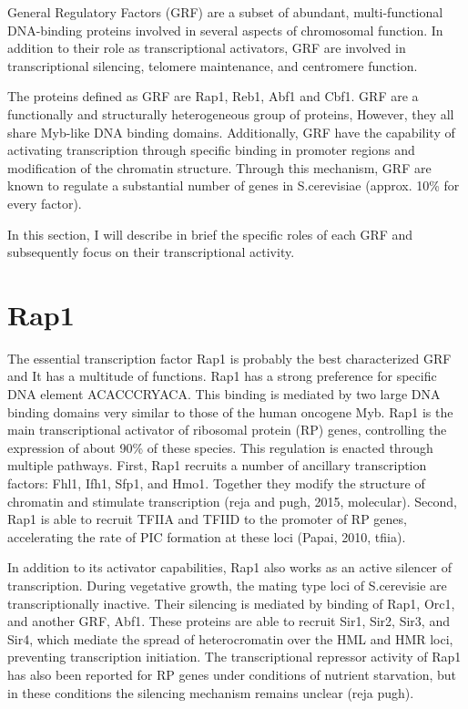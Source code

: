General Regulatory Factors (GRF) are a subset of abundant, multi-functional DNA-binding proteins involved in several aspects of chromosomal function. In addition to their role as transcriptional activators, GRF are involved in transcriptional silencing, telomere maintenance, and centromere function.

The proteins defined as GRF are Rap1, Reb1, Abf1 and Cbf1. GRF are a functionally and structurally heterogeneous group of proteins, However, they all share Myb-like DNA binding domains. Additionally, GRF have the capability of activating transcription through specific binding in promoter regions and modification of the chromatin structure. Through this mechanism, GRF are known to regulate a substantial number of genes in S.cerevisiae (approx. 10\% for every factor).

In this section, I will describe in brief the specific roles of each GRF and subsequently focus on their transcriptional activity.



\section{Rap1}
The essential transcription factor Rap1 is probably the best characterized GRF and It has a multitude of functions. Rap1 has a strong preference for specific DNA element ACACCCRYACA. This binding is mediated by two large DNA binding domains very similar to those of the human oncogene Myb. 
Rap1 is the main transcriptional activator of ribosomal protein (RP) genes, controlling the expression of about 90\% of these species. This regulation is enacted through multiple pathways. First, Rap1 recruits a number of ancillary transcription factors: Fhl1, Ifh1, Sfp1, and Hmo1. Together they modify the structure of chromatin and stimulate transcription (reja and pugh, 2015, molecular). Second, Rap1 is able to recruit TFIIA and TFIID to the promoter of RP genes, accelerating the rate of PIC formation at these loci (Papai, 2010, tfiia).

In addition to its activator capabilities, Rap1 also works as an active silencer of transcription. During vegetative growth, the mating type loci of S.cerevisie are transcriptionally inactive. Their silencing is mediated by binding of Rap1, Orc1, and another GRF, Abf1. These proteins are able to recruit Sir1, Sir2, Sir3, and Sir4, which mediate the spread of heterocromatin over the HML and HMR loci, preventing transcription initiation. The transcriptional repressor activity of Rap1 has also been reported for RP genes under conditions of nutrient starvation, but in these conditions the silencing mechanism remains unclear (reja pugh). 

